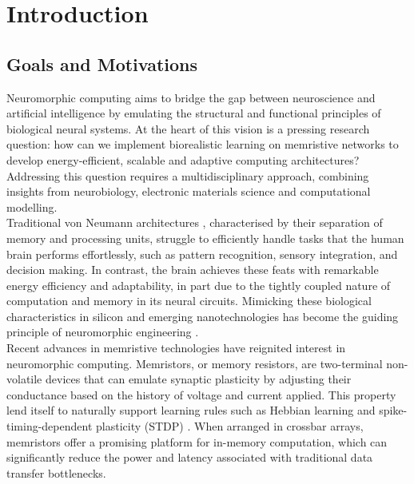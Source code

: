 
\chapter{Introduction}  %

\section[Goals and Motivations]{Goals and Motivations}

Neuromorphic computing aims to bridge the gap between neuroscience and artificial intelligence by emulating the structural and functional principles of biological neural systems. At the heart of this vision is a pressing research question: how can we implement biorealistic learning on memristive networks to develop energy-efficient, scalable and adaptive computing architectures? Addressing this question requires a multidisciplinary approach, combining insights from neurobiology, electronic materials science and computational modelling. \\

\noindent Traditional von Neumann architectures \cite{von1993first}, characterised by their separation of memory and processing units, struggle to efficiently handle tasks that the human brain performs effortlessly, such as pattern recognition, sensory integration, and decision making. In contrast, the brain achieves these feats with remarkable energy efficiency and adaptability, in part due to the tightly coupled nature of computation and memory in its neural circuits. Mimicking these biological characteristics in silicon and emerging nanotechnologies has become the guiding principle of neuromorphic engineering \cite{saighi2015plasticity}. \\

\noindent Recent advances in memristive technologies have reignited interest in neuromorphic computing. Memristors, or memory resistors, are two-terminal non-volatile devices that can emulate synaptic plasticity by adjusting their conductance based on the history of voltage and current applied. This property lend itself to naturally support learning rules such as Hebbian learning \cite{hebb2005organization} and spike-timing-dependent plasticity (STDP) \cite{markram1997regulation}. When arranged in crossbar arrays, memristors offer a promising platform for in-memory computation, which can significantly reduce the power and latency associated with traditional data transfer bottlenecks. \\

